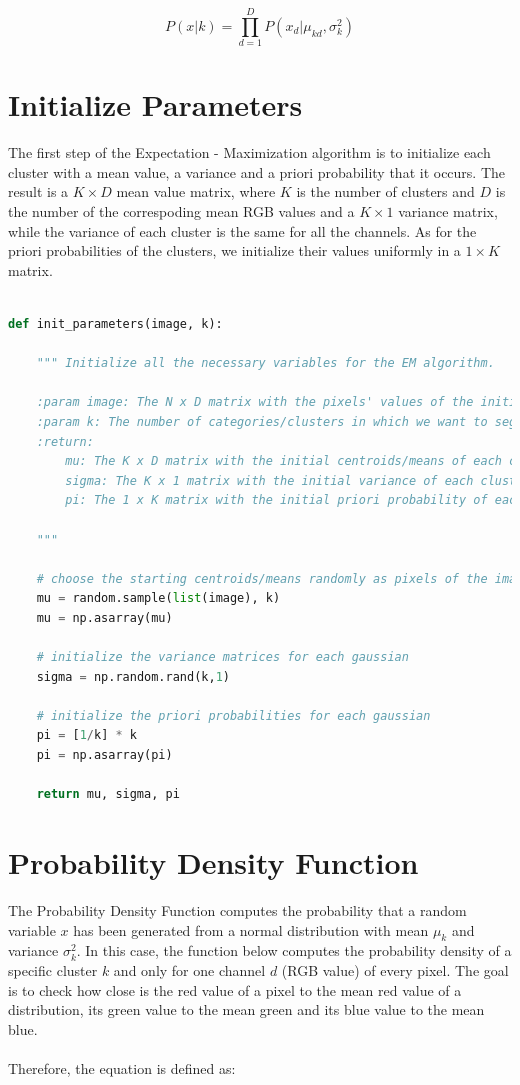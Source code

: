 \documentclass[11pt]{article}
\begin{document}
$$
P(x|k) = \prod_{d=1}^{D} P(x_{d}| \mu_{kd}, \sigma_{k}^2)
$$

\newpage

\section{Initialize Parameters}
The first step of the Expectation - Maximization algorithm is to initialize each cluster with a mean value, a variance and a priori probability that it occurs. The result is a $K \times D $ mean value matrix, where $K$ is the number of clusters and $D$ is the number of the correspoding mean RGB values and a $ K \times 1$ variance matrix, while the variance of each cluster is the same for all the channels.
As for the priori probabilities of the clusters, we initialize their values uniformly in a $1 \times K$ matrix.

\begin{lstlisting}[language = Python]

def init_parameters(image, k):
    
    """ Initialize all the necessary variables for the EM algorithm.
    
    :param image: The N x D matrix with the pixels' values of the initial            image
    :param k: The number of categories/clusters in which we want to segment          the image
    :return: 
        mu: The K x D matrix with the initial centroids/means of each cluster
        sigma: The K x 1 matrix with the initial variance of each cluster
        pi: The 1 x K matrix with the initial priori probability of each             cluster
    
    """
    
    # choose the starting centroids/means randomly as pixels of the image
    mu = random.sample(list(image), k)
    mu = np.asarray(mu)
    
    # initialize the variance matrices for each gaussian
    sigma = np.random.rand(k,1)
    
    # initialize the priori probabilities for each gaussian
    pi = [1/k] * k
    pi = np.asarray(pi)
    
    return mu, sigma, pi
\end{lstlisting}
\newpage
\section{Probability Density Function}

The Probability Density Function computes the probability that a random variable $x$ has been generated from a normal distribution with mean $\mu_{k}$ and variance $\sigma_{k}^2$. In this case, the function below computes the probability density of a specific cluster $k$ and only for one channel $d$ (RGB value) of every pixel.
The goal is to check how close is the red value of a pixel to the mean red value of a distribution, its green value to the mean green and its blue value to the mean blue.\\
\\
Therefore, the equation is defined as:
\end{document}
